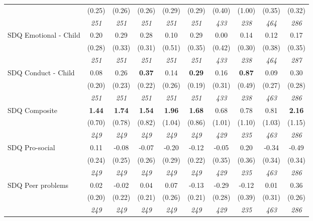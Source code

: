 \begin{tabular}{l c c c c c c c c c}
& (0.25) & (0.26) & (0.26) & (0.29) & (0.29) & (0.40) & (1.00) & (0.35) & (0.32) \\
& \textit{ 251 } & \textit{ 251 } & \textit{ 251 } & \textit{ 251 } & \textit{ 251 } & \textit{ 433 } & \textit{ 238 } & \textit{ 464 } & \textit{ 286 } \\
SDQ Emotional - Child & 0.20 & 0.29 & 0.28 & 0.10 & 0.29 & 0.00 & 0.14 & 0.12 & 0.17 \\
& (0.28) & (0.33) & (0.31) & (0.51) & (0.35) & (0.42) & (0.30) & (0.38) & (0.35) \\
& \textit{ 251 } & \textit{ 251 } & \textit{ 251 } & \textit{ 251 } & \textit{ 251 } & \textit{ 433 } & \textit{ 238 } & \textit{ 464 } & \textit{ 287 } \\
SDQ Conduct - Child & 0.08 & 0.26 & \textbf{ 0.37 } & 0.14 & \textbf{0.29} & 0.16 & \textbf{0.87} & 0.09 & 0.30 \\
& (0.20) & (0.23) & (0.22) & (0.26) & (0.19) & (0.31) & (0.49) & (0.27) & (0.28) \\
& \textit{ 251 } & \textit{ 251 } & \textit{ 251 } & \textit{ 251 } & \textit{ 251 } & \textit{ 433 } & \textit{ 238 } & \textit{ 463 } & \textit{ 286 } \\
SDQ Composite & \textbf{ 1.44 } & \textbf{ 1.74 } & \textbf{ 1.54 } & \textbf{1.96} & \textbf{1.68} & 0.68 & 0.78 & 0.81 & \textbf{2.16} \\
& (0.70) & (0.78) & (0.82) & (1.04) & (0.86) & (1.01) & (1.10) & (1.03) & (1.15) \\
& \textit{ 249 } & \textit{ 249 } & \textit{ 249 } & \textit{ 249 } & \textit{ 249 } & \textit{ 429 } & \textit{ 235 } & \textit{ 463 } & \textit{ 286 } \\
SDQ Pro-social & 0.11 & -0.08 & -0.07 & -0.20 & -0.12 & -0.05 & 0.20 & -0.34 & -0.49 \\
& (0.24) & (0.25) & (0.26) & (0.29) & (0.22) & (0.35) & (0.36) & (0.34) & (0.34) \\
& \textit{ 249 } & \textit{ 249 } & \textit{ 249 } & \textit{ 249 } & \textit{ 249 } & \textit{ 429 } & \textit{ 235 } & \textit{ 463 } & \textit{ 286 } \\
SDQ Peer problems & 0.02 & -0.02 & 0.04 & 0.07 & -0.13 & -0.29 & -0.12 & 0.01 & 0.36 \\
& (0.20) & (0.22) & (0.21) & (0.26) & (0.21) & (0.28) & (0.39) & (0.31) & (0.26) \\
& \textit{ 249 } & \textit{ 249 } & \textit{ 249 } & \textit{ 249 } & \textit{ 249 } & \textit{ 429 } & \textit{ 235 } & \textit{ 463 } & \textit{ 286 } \\

\end{tabular}
